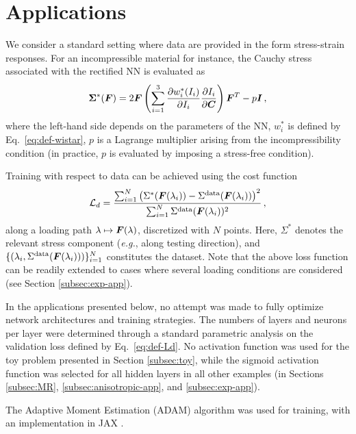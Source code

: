 \section{Applications}\label{sec:applications}
We consider a standard setting where data are provided in the form stress-strain responses. For an incompressible material for instance, the Cauchy stress associated with the rectified NN is evaluated as
\begin{equation}
    {\bf\Sigma}^*(\boldsymbol{F}) = 2 {\boldsymbol{F}} \left(\sum_{i = 1}^{3} \frac{\partial w_i^*(I_i)}{ \partial I_i} \frac{\partial I_i}{ \partial \boldsymbol{C}} \right) \boldsymbol{F}^T - p\boldsymbol{I}\,,
\end{equation}
where the left-hand side depends on the parameters of the NN, $w_i^*$ is defined by Eq.~\eqref{eq:def-wistar}, $p$ is a Lagrange multiplier arising from the incompressibility condition (in practice, $p$ is evaluated by imposing a stress-free condition). 

Training with respect to data can be achieved using the cost function
\begin{equation}\label{eq:def-Ld}
     \mathcal{L}_d = \frac{\sum_{i = 1}^{N} \left( \Sigma^*(\boldsymbol{F}(\lambda_i)) - \Sigma^{\textnormal{data}}(\boldsymbol{F}(\lambda_i)) \right)^2}{\sum_{i = 1}^{N} \Sigma^{\textnormal{data}}(\boldsymbol{F}(\lambda_i))^2 }\,,
\end{equation}
along a loading path $\lambda \mapsto \boldsymbol{F}(\lambda)$, discretized with $N$ points. Here, $\Sigma^*$ denotes the relevant stress component (\textit{e.g.}, along testing direction), and $\{(\lambda_i, \Sigma^{\textnormal{data}}(\boldsymbol{F}(\lambda_i)))\}_{i = 1}^{N}$ constitutes the dataset. Note that the above loss function can be readily extended to cases where several loading conditions are considered (see Section \ref{subsec:exp-app}).

In the applications presented below, no attempt was made to fully optimize network architectures and training strategies. The numbers of layers and neurons per layer were determined through a standard parametric analysis on the validation loss defined by Eq.~\eqref{eq:def-Ld}. No activation function was used for the toy problem presented in Section \ref{subsec:toy}, while the sigmoid activation function was selected for all hidden layers in all other examples (in Sections \ref{subsec:MR}, \ref{subsec:anisotropic-app}, and \ref{subsec:exp-app}). 

The Adaptive Moment Estimation (ADAM) algorithm was used for training, with an implementation in JAX \cite{jax2018github}. 

